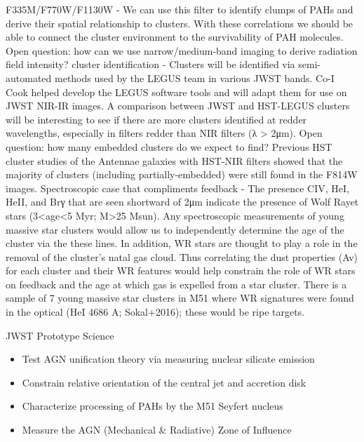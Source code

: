 \documentclass[12pt]{article}
\begin{document}
F335M/F770W/F1130W - We can use this filter to identify clumps of PAHs and derive their spatial relationship to clusters. With these correlations we should be able to connect the cluster environment to the survivability of PAH molecules. Open question: how can we use narrow/medium-band imaging to derive radiation field intensity?
cluster identification - Clusters will be identified via semi-automated methods used by the LEGUS team in various JWST bands. Co-I Cook helped develop the LEGUS software tools and will adapt them for use on JWST NIR-IR images. A comparison between JWST and HST-LEGUS clusters will be interesting to see if there are more clusters identified at redder wavelengths, especially in filters redder than NIR filters (λ > 2μm). Open question: how many embedded clusters do we expect to find? Previous HST cluster studies of the Antennae galaxies with HST-NIR filters showed that the majority of clusters (including partially-embedded) were still found in the F814W images.
Spectroscopic case that compliments feedback - The presence  CIV,  HeI,  HeII,  and  Brγ that are seen shortward of 2μm indicate the presence of Wolf Rayet stars (3<age<5 Myr; M>25 Msun). Any spectroscopic measurements of young massive star clusters would allow us to independently determine the age of the cluster via the these lines. In addition, WR stars are thought to play a role in the removal of the cluster's natal gas cloud. Thus correlating the dust properties (Av) for each cluster and their WR features would help constrain the role of WR stars on feedback and the age at which gas is expelled from a star cluster. There is a sample of 7 young massive star clusters in M51 where WR signatures were found in the optical (HeI 4686 A; Sokal+2016); these would be ripe targets. 

\vspace{0.1in}


JWST Prototype Science
\begin{itemize}
    \item{Test AGN unification theory via measuring nuclear silicate emission}
    \item{Constrain relative orientation of the central jet and accretion disk}
    \item{Characterize processing of PAHs by the M51 Seyfert nucleus}
    \item{Measure the AGN (Mechanical \& Radiative) Zone of Influence}
\end{itemize}
\end{document}
